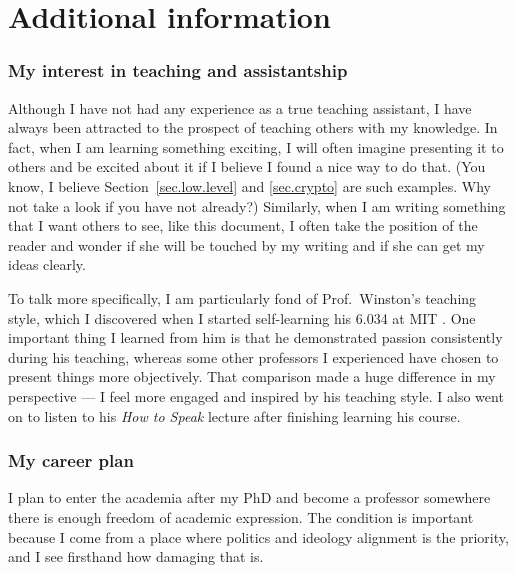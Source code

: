 \part{Additional information}

\section{My interest in teaching and assistantship}
Although I have not had any experience as a true teaching assistant, I have
always been attracted to the prospect of teaching others with my knowledge. In
fact, when I am learning something exciting, I will often imagine presenting it
to others and be excited about it if I believe I found a nice way to do that.
(You know, I believe Section~\ref{sec.low.level} and \ref{sec.crypto} are such
examples. Why not take a look if you have not already?)
Similarly, when I am writing something that I want others to see, like this
document, I often take the position of the reader and wonder if she will be
touched by my writing and if she can get my ideas clearly.

To talk more specifically, I am particularly fond of Prof.~Winston's teaching
style, which I discovered when I started self-learning his 6.034 at MIT
\cite{winston.ai}. One important thing I learned from him is that he
demonstrated passion consistently during his teaching, whereas some other
professors I experienced have chosen to present things more objectively.  That
comparison made a huge difference in my perspective --- I feel more engaged and
inspired by his teaching style. I also went on to listen to his \emph{How to
Speak} lecture \cite{winston.htspk} after finishing learning his course.

\section{My career plan}
I plan to enter the academia after my PhD and become a professor somewhere
there is enough freedom of academic expression. The condition is important
because I come from a place where politics and ideology alignment is the
priority, and I see firsthand how damaging that is.

